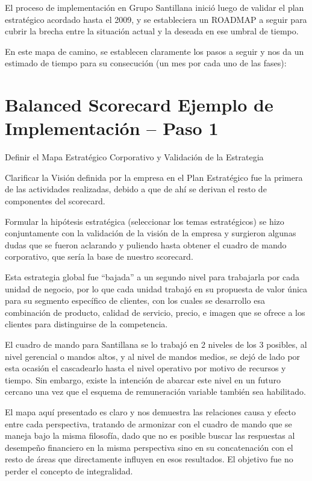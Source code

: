 \item {El proceso de implementación en Grupo Santillana inició luego de validar  el plan estratégico acordado hasta el 2009, y se estableciera un ROADMAP a seguir para cubrir la brecha entre la situación actual y la deseada en ese umbral de tiempo.

En este mapa de camino, se establecen claramente los pasos a seguir y nos da un estimado de tiempo para su consecución (un mes por cada uno de las fases):}

\section{Balanced Scorecard Ejemplo de Implementación – Paso 1}
\item {Definir el Mapa Estratégico Corporativo y Validación de la Estrategia

Clarificar la Visión definida por la empresa en el Plan Estratégico fue la primera de las actividades realizadas, debido a que de ahí se derivan el resto de componentes del scorecard.

Formular la hipótesis estratégica (seleccionar los temas estratégicos) se hizo conjuntamente con la validación de la visión de la empresa y surgieron algunas dudas que se fueron aclarando y puliendo hasta obtener el cuadro de mando corporativo, que sería la base de nuestro scorecard.

Esta estrategia global fue “bajada” a un segundo nivel para trabajarla por cada unidad de negocio, por lo que cada unidad trabajó en su propuesta de valor única para su segmento específico de clientes, con los cuales se desarrollo esa combinación de producto, calidad de servicio, precio, e imagen que se ofrece a los clientes para distinguirse de la competencia.

El cuadro de mando para Santillana se lo trabajó en 2 niveles de los 3 posibles, al nivel gerencial o mandos altos, y al nivel de mandos medios, se dejó de lado por esta ocasión el cascadearlo hasta el nivel operativo por motivo de recursos y tiempo. Sin embargo, existe la intención de abarcar este nivel en un futuro cercano una vez que el esquema de remuneración variable también sea habilitado.

El mapa aquí presentado es claro y nos demuestra las relaciones causa y efecto entre cada perspectiva, tratando de armonizar con el cuadro de mando que se maneja bajo la misma filosofía, dado que no es posible buscar las respuestas al desempeño financiero en la misma perspectiva sino en su concatenación con el resto de áreas que directamente influyen en esos resultados. El objetivo fue no perder el concepto de integralidad.}

